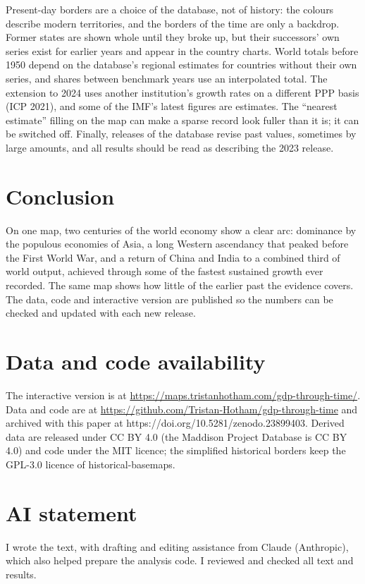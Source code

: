 \documentclass[11pt,a4paper]{article}
\begin{document}
Present-day borders are a choice of the database, not of history: the colours describe modern territories, and the borders of the time are only a backdrop. Former states are shown whole until they broke up, but their successors' own series exist for earlier years and appear in the country charts. World totals before 1950 depend on the database's regional estimates for countries without their own series, and shares between benchmark years use an interpolated total. The extension to 2024 uses another institution's growth rates on a different PPP basis (ICP 2021), and some of the IMF's latest figures are estimates. The ``nearest estimate'' filling on the map can make a sparse record look fuller than it is; it can be switched off. Finally, releases of the database revise past values, sometimes by large amounts, and all results should be read as describing the 2023 release.

\section{Conclusion}
On one map, two centuries of the world economy show a clear arc: dominance by the populous economies of Asia, a long Western ascendancy that peaked before the First World War, and a return of China and India to a combined third of world output, achieved through some of the fastest sustained growth ever recorded. The same map shows how little of the earlier past the evidence covers. The data, code and interactive version are published so the numbers can be checked and updated with each new release.

\section*{Data and code availability}
The interactive version is at \url{https://maps.tristanhotham.com/gdp-through-time/}. Data and code are at \url{https://github.com/Tristan-Hotham/gdp-through-time} and archived with this paper at https://doi.org/10.5281/zenodo.23899403. Derived data are released under CC BY 4.0 (the Maddison Project Database is CC BY 4.0) and code under the MIT licence; the simplified historical borders keep the GPL-3.0 licence of historical-basemaps.

\section*{AI statement}
I wrote the text, with drafting and editing assistance from Claude (Anthropic), which also helped prepare the analysis code. I reviewed and checked all text and results.
\end{document}
